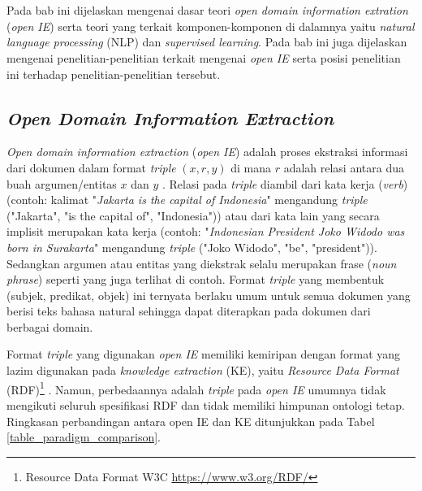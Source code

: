 \chapter{\babDua}
\label{chap:babDua}
Pada bab ini dijelaskan mengenai dasar teori \textit{open domain information extration} (\textit{open IE}) serta teori yang terkait komponen-komponen di dalamnya yaitu \textit{natural language processing} (NLP) dan \textit{supervised learning}. Pada bab ini juga dijelaskan mengenai penelitian-penelitian terkait mengenai \textit{open IE} serta posisi penelitian ini terhadap penelitian-penelitian tersebut.

\section{\textit{Open Domain Information Extraction}}

\textit{Open domain information extraction} (\textit{open IE}) adalah proses ekstraksi informasi dari dokumen dalam format \textit{triple} $(x, r, y)$ di mana $r$ adalah relasi antara dua buah argumen/entitas $x$ dan $y$ \citep{banko2007open, etzioni2011open}. Relasi pada \textit{triple} diambil dari kata kerja (\textit{verb}) \citep{banko2007open, fader2011identifying} (contoh: kalimat "\textit{Jakarta is the capital of Indonesia}" mengandung \textit{triple} ("Jakarta", "is the capital of", "Indonesia")) atau dari kata lain yang secara implisit merupakan kata kerja \citep{schmitz2012open} (contoh: "\textit{Indonesian President Joko Widodo was born in Surakarta}" mengandung \textit{triple} ("Joko Widodo", "be", "president")). Sedangkan argumen atau entitas yang diekstrak selalu merupakan frase (\textit{noun phrase}) seperti yang juga terlihat di contoh. Format \textit{triple} yang membentuk (subjek, predikat, objek) ini ternyata berlaku umum untuk semua dokumen yang berisi teks bahasa natural sehingga dapat diterapkan pada dokumen dari berbagai domain. 

Format \textit{triple} yang digunakan \textit{open IE} memiliki kemiripan dengan format yang lazim digunakan pada \textit{knowledge extraction} (KE), yaitu \textit{Resource Data Format} (RDF)\footnote{Resource Data Format W3C \url{https://www.w3.org/RDF/}} \citep{auer2007dbpedia, exner2014refractive}. Namun, perbedaannya adalah \textit{triple} pada \textit{open IE} umumnya tidak mengikuti seluruh spesifikasi RDF dan tidak memiliki himpunan ontologi tetap. Ringkasan perbandingan antara open IE dan KE ditunjukkan pada Tabel \ref{table_paradigm_comparison}. 

